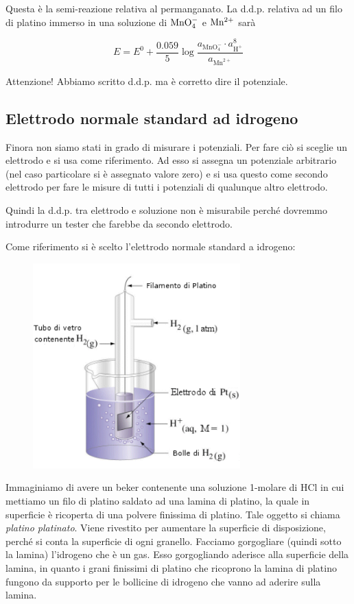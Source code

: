 Questa è la semi-reazione relativa al permanganato. La d.d.p. relativa ad un filo di platino immerso in una soluzione di $\rm MnO_4^-$ e $\rm Mn^{2+}$ sarà

$$E = E^0 + \frac{0.059}{5} \log \frac{a_{\text{MnO}_4^-} \cdot a^8_{\text{H}^+}}{a_{\text{Mn}^{2+}}}$$

Attenzione! Abbiamo scritto d.d.p. ma è corretto dire il potenziale.
\subsection{Elettrodo normale standard ad idrogeno}
Finora non siamo stati in grado di misurare i potenziali. Per fare ciò si sceglie un elettrodo e si usa come riferimento. Ad esso si assegna un potenziale arbitrario (nel caso particolare si è assegnato valore zero) e si usa questo come secondo elettrodo per fare le misure di tutti i potenziali di qualunque altro elettrodo.

Quindi la d.d.p. tra elettrodo e soluzione non è misurabile perché dovremmo introdurre un tester che farebbe da secondo elettrodo.

Come riferimento si è scelto l'elettrodo normale standard a idrogeno:

\begin{minipage}{0.55\textwidth}
    \begin{figure}[H]
        \centering
        \includegraphics[width=8cm]{immagini/Elettrodo_a_idrogeno.png}
    \end{figure}
\end{minipage}
\begin{minipage}{0.45\textwidth}
    \vspace{0.7cm}Immaginiamo di avere un beker contenente una soluzione 1-molare di HCl in cui mettiamo un filo di platino saldato ad una lamina di platino, la quale in superficie è ricoperta di una polvere finissima di platino. Tale oggetto si chiama \textit{platino platinato}. Viene rivestito per aumentare la superficie di disposizione, perché si conta la superficie di ogni granello. Facciamo gorgogliare (quindi sotto la lamina) l'idrogeno che è un gas. Esso gorgogliando aderisce alla superficie della lamina, in quanto i grani finissimi di platino che ricoprono la lamina di platino fungono da supporto per le bollicine di idrogeno che vanno ad aderire sulla lamina.
\end{minipage}

